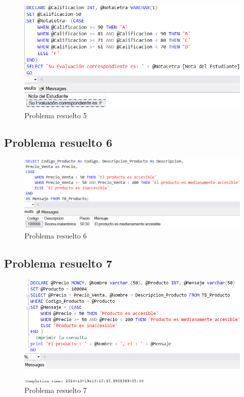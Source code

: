 \begin{figure}[H]
  \centering
  \includegraphics[scale = 0.5]{Imagenes/probs_resueltos/pr5.png}
  \caption{Problema resuelto 5}
\end{figure}

\subsection{Problema resuelto 6}

\begin{figure}[H]
  \centering
  \includegraphics[scale = 0.5]{Imagenes/probs_resueltos/pr6.png}
  \caption{Problema resuelto 6}
\end{figure}

\subsection{Problema resuelto 7}

\begin{figure}[H]
  \centering
  \includegraphics[scale = 0.5]{Imagenes/probs_resueltos/pr7.png}
  \caption{Problema resuelto 7}
\end{figure}

